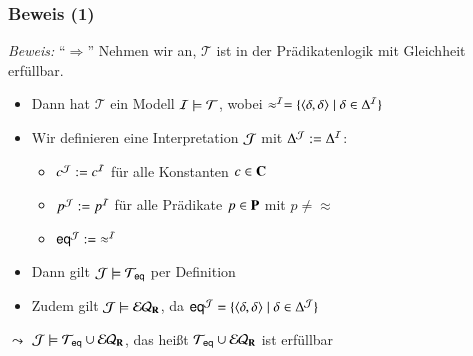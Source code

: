 \documentclass[aspectratio=1610,onlymath]{beamer}
\begin{document}
\begin{frame}[t]\frametitle{Beweis (1)}


\emph{Beweis:} "`$\Rightarrow$"' Nehmen wir an, $\mathcal{T}$ ist in der Prädikatenlogik mit Gleichheit erfüllbar.\pause
\begin{itemize}
\item Dann hat $\mathcal{T}$ ein Modell $\mathcal{I}\models\mathcal{T}$, wobei $\approx^{\mathcal{I}}=\{\langle{\delta,\delta}\rangle\mid \delta\in\Delta^{\mathcal{I}}\}$\pause
\item Wir definieren eine Interpretation $\mathcal{J}$ mit $\Delta^{\mathcal{J}}\mathrel{:=}\Delta^{\mathcal{I}}$:
	\begin{itemize}
	\item $c^{\mathcal{J}}\mathrel{:=} c^{\mathcal{I}}$ für alle Konstanten $c\in\textbf{\textcolor{black}{C}}$
	\item $p^{\mathcal{J}}\mathrel{:=} p^{\mathcal{I}}$ für alle Prädikate $p\in\textbf{\textcolor{black}{P}}$ mit $p\neq{\approx}$
	\item $\textsf{eq}^{\mathcal{J}}\mathrel{:=} {\approx^{\mathcal{I}}}$
	\end{itemize}\pause
\item Dann gilt $\mathcal{J}\models\mathcal{T}_{\textsf{eq}}$ per Definition\pause
\item Zudem gilt $\mathcal{J}\models\mathcal{EQ}_{\textbf{\textcolor{black}{R}}}$, da $\textsf{eq}^{\mathcal{J}}=\{\langle{\delta,\delta}\rangle\mid \delta\in\Delta^{\mathcal{J}}\}$\pause
\end{itemize}
$\leadsto$ $\mathcal{J}\models\mathcal{T}_{\textsf{eq}}\cup\mathcal{EQ}_{\textbf{\textcolor{black}{R}}}$, das heißt $\mathcal{T}_{\textsf{eq}}\cup\mathcal{EQ}_{\textbf{\textcolor{black}{R}}}$ ist erfüllbar
\end{frame}
\end{document}
